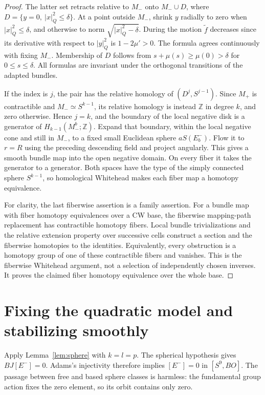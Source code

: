 \documentclass[11pt]{article}
\newcommand{\Z}{\mathbb Z}
\begin{document}
\begin{proof}
The latter set retracts relative to \(M_-\) onto \(M_-\cup D\), where
\(D=\{y=0,\ |x|_Q^2\leq\delta\}\).
At a point outside \(M_-\), shrink \(y\) radially to zero when
\(|x|_Q^2\leq\delta\), and otherwise to norm
\(\sqrt{|x|_Q^2-\delta}\). During the motion \(\widetilde f\)
decreases since its derivative with respect to \(|y|_Q^2\) is
\(1-2\mu'>0\). The formula agrees continuously with fixing \(M_-\).
Membership of \(D\) follows from
\(s+\mu(s)\geq\mu(0)>\delta\) for \(0\leq s\leq\delta\).
All formulas are invariant under the orthogonal transitions of
the adapted bundles.

If the index is \(j\), the pair has the relative homology of
\((D^j,S^{j-1})\). Since \(M_+\) is contractible and
\(M_-\simeq S^{k-1}\), its relative homology is instead \(\Z\) in
degree \(k\), and zero otherwise. Hence \(j=k\), and the boundary
of the local negative disk is a generator of
\(H_{k-1}(M_-^b;\Z)\).
Expand that boundary, within the local negative cone and still in
\(M_-\), to a fixed small Euclidean sphere \(aS(E_b^-)\).
Flow it to \(r=R\) using the preceding descending field and project
angularly. This gives a smooth bundle map into the open negative
domain. On every fiber it takes the generator to a generator.
Both spaces have the type of the simply connected sphere
\(S^{k-1}\), so homological Whitehead makes each fiber map a
homotopy equivalence.

For clarity, the last fiberwise assertion is a family assertion.
For a bundle map with fiber homotopy equivalences over a CW base,
the fiberwise mapping-path replacement has contractible homotopy
fibers. Local bundle trivializations and the relative extension
property over successive cells construct a section and the
fiberwise homotopies to the identities. Equivalently, every
obstruction is a homotopy group of one of these contractible fibers
and vanishes. This is the fiberwise Whitehead argument, not a
selection of independently chosen inverses. It proves the claimed
fiber homotopy equivalence over the whole base.
\end{proof}

\section{Fixing the quadratic model and stabilizing smoothly}

Apply Lemma~\ref{lem:sphere} with \(k=l=p\).
The spherical hypothesis gives \(BJ[E^-]=0\).
Adams's injectivity therefore implies \([E^-]=0\) in \([S^9,BO]\).
The passage between free and based sphere classes is harmless:
the fundamental group action fixes the zero element, so its orbit
contains only zero.
\end{document}
